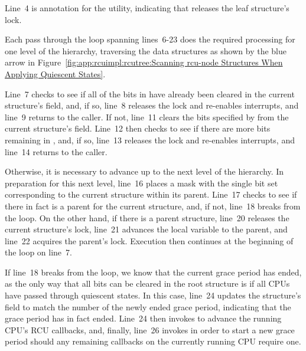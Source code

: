 Line~4 is annotation for the  utility, indicating
that  releases the leaf 
structure's lock.

\begin{figure*}[tb]
\centering
{}
\caption{Scanning {\tt rcu\_node} Structures When Applying Quiescent States}
\label{fig:app:rcuimpl:rcutree:Scanning rcu-node Structures When Applying Quiescent States}
\end{figure*}

Each pass through the loop spanning lines~6-23 does the required
processing for one level of the  hierarchy, traversing
the data structures as shown by the blue arrow in
Figure~\ref{fig:app:rcuimpl:rcutree:Scanning rcu-node Structures When Applying Quiescent States}.

Line~7 checks to see if all of the bits in  have already
been cleared in the current  structure's 
field, and, if so, line~8 releases the lock and re-enables interrupts,
and line~9 returns to the caller.
If not, line~11 clears the bits specified by  from the current
 structure's  field.
Line~12 then checks to see if there are more bits remaining
in , and, if so, line~13 releases the lock and re-enables
interrupts, and line~14 returns to the caller.

Otherwise, it is necessary to advance up to the next level of the
 hierarchy.
In preparation for this next level, line~16 places a mask with the
single bit set corresponding to the current  structure within
its parent.
Line~17 checks to see if there in fact is a parent for the current
 structure, and, if not, line~18 breaks from the
loop.
On the other hand, if there is a parent  structure,
line~20 releases the current  structure's lock,
line~21 advances the  local variable to the parent,
and line~22 acquires the parent's lock.
Execution then continues at the beginning of the loop on line~7.

If line~18 breaks from the loop, we know that the current grace period
has ended, as the only way that all bits can be cleared in the
root  structure is if all CPUs have passed through
quiescent states.
In this case, line~24 updates the  structure's
 field to match the number of the newly ended grace
period, indicating that the grace period has in fact ended.
Line~24 then invokes  to advance the
running CPU's RCU callbacks,
and, finally, line~26 invokes  in order to
start a new grace period should any remaining callbacks on the currently
running CPU require one.

